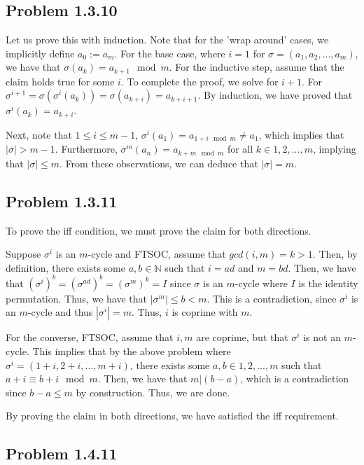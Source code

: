 \documentclass[11 pt]{article}
\theoremstyle{definition}
\theoremstyle{remark}
\begin{document}
\subsection*{Problem 1.3.10}
Let us prove this with induction. Note that for the 'wrap around' cases, we implicitly define $a_0 := a_m$. For the base case, where $i=1$ for $\sigma = (a_1, a_2, ..., a_m)$, we have that $\sigma(a_k) = a_{k+1} \mod m$. For the inductive step, assume that the claim holds true for some $i$. To complete the proof, we solve for $i+1$. For $\sigma^{i+1} = \sigma(\sigma^i(a_k)) = \sigma(a_{k+i}) = a_{k+i+1}$. By induction, we have proved that $\sigma^i(a_k)=a_{k+i}$.

Next, note that $1 \leq i \leq m-1$, $\sigma^i(a_1) = a_{1+i \mod m} \neq a_1$, which implies that $|\sigma| > m-1$. Furthermore, $\sigma^m(a_n) = a_{k+m \mod m}$ for all $k \in {1,2,...,m}$, implying that $|\sigma| \leq m$. From these observations, we can deduce that $|\sigma| = m$.

\subsection*{Problem 1.3.11}
To prove the iff condition, we must prove the claim for both directions.

Suppose $\sigma^i$ is an $m$-cycle and FTSOC, assume that $gcd(i,m) = k > 1$. Then, by definition, there exists some $a,b \in \mathbb{N}$ such that $i=ad$ and $m=bd$. Then, we have that $(\sigma^i)^b = (\sigma^{ad})^b = (\sigma^m)^k = I$ since $\sigma$ is an $m$-cycle where $I$ is the identity permutation. Thus, we have that $|\sigma^m| \leq b < m$. This is a contradiction, since $\sigma^i$ is an $m$-cycle and thus $|\sigma^i| = m$. Thus, $i$ is coprime with $m$.

For the converse, FTSOC, assume that $i,m$ are coprime, but that $\sigma^i$ is not an $m$-cycle. This implies that by the above problem where $\sigma^i = (1+i, 2+i, ..., m+i)$, there exists some $a,b \in {1,2,...,m}$ such that $a+i \equiv b+i \mod m$. Then, we have that $m | (b-a)$, which is a contradiction since $b-a \leq m$ by construction. Thus, we are done.

By proving the claim in both directions, we have satisfied the iff requirement.

\subsection*{Problem 1.4.11}
\end{document}
